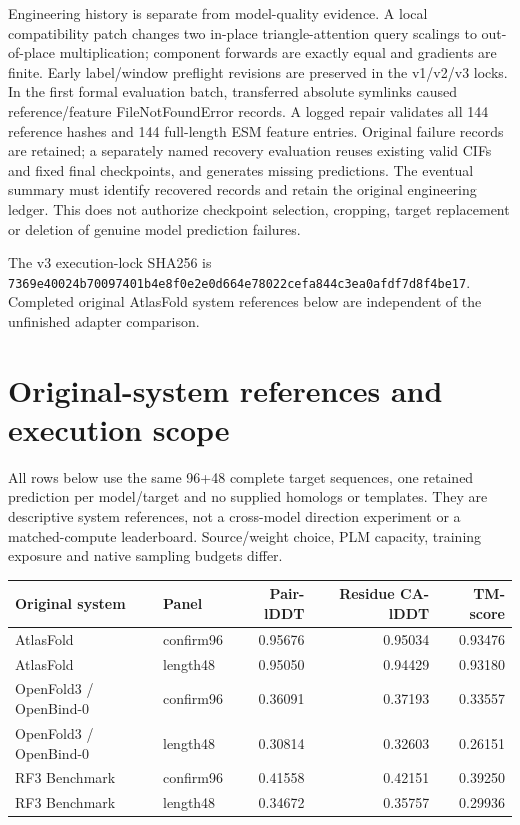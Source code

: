 Engineering history is separate from model-quality evidence. A local compatibility
patch changes two in-place triangle-attention query scalings to out-of-place
multiplication; component forwards are exactly equal and gradients are finite.
Early label/window preflight revisions are preserved in the v1/v2/v3 locks.
In the first formal evaluation batch, transferred absolute symlinks caused
reference/feature FileNotFoundError records. A logged repair validates all 144
reference hashes and 144 full-length ESM feature entries. Original failure
records are retained; a separately named recovery evaluation reuses existing
valid CIFs and fixed final checkpoints, and generates missing predictions.
The eventual summary must identify recovered records and retain the original
engineering ledger. This does not authorize checkpoint selection, cropping,
target replacement or deletion of genuine model prediction failures.

The v3 execution-lock SHA256 is
\nolinkurl{7369e40024b70097401b4e8f0e2e0d664e78022cefa844c3ea0afdf7d8f4be17}.
Completed original AtlasFold system references below are independent of the
unfinished adapter comparison.

\section{Original-system references and execution scope}\label{original-system-references-and-execution-scope}

All rows below use the same 96+48 complete target sequences, one retained
prediction per model/target and no supplied homologs or templates. They are
descriptive system references, not a cross-model direction experiment or a
matched-compute leaderboard. Source/weight choice, PLM capacity, training
exposure and native sampling budgets differ.

\begin{longtable}[]{@{}llrrr@{}}
\toprule\noalign{}
Original system & Panel & Pair-lDDT & Residue CA-lDDT & TM-score \\
\midrule\noalign{}
\endhead
\bottomrule\noalign{}
\endlastfoot
AtlasFold & confirm96 & 0.95676 & 0.95034 & 0.93476 \\
AtlasFold & length48 & 0.95050 & 0.94429 & 0.93180 \\
OpenFold3 / OpenBind-0 & confirm96 & 0.36091 & 0.37193 & 0.33557 \\
OpenFold3 / OpenBind-0 & length48 & 0.30814 & 0.32603 & 0.26151 \\
RF3 Benchmark & confirm96 & 0.41558 & 0.42151 & 0.39250 \\
RF3 Benchmark & length48 & 0.34672 & 0.35757 & 0.29936 \\
\end{longtable}


